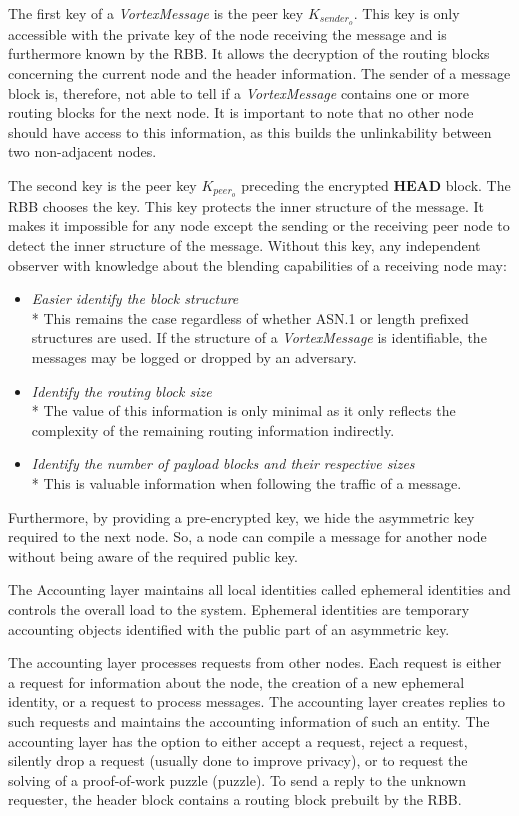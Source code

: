 \documentclass[acmsmall, screen]{acmart}
\begin{document}
The first key of a \emph{VortexMessage} is the peer key $K_{sender_o}$. This key is only accessible with the private key of the node receiving the message and is furthermore known by the RBB. It allows the decryption of the routing blocks concerning the current node and the header information. The sender of a message block is, therefore, not able to tell if a \emph{VortexMessage} contains one or more routing blocks for the next node. It is important to note that no other node should have access to this information, as this builds the unlinkability between two non-adjacent nodes. 

The second key is the peer key $K_{peer_o}$ preceding the encrypted $\mathbf{HEAD}$ block. The RBB chooses the key. This key protects the inner structure of the message. It makes it impossible for any node except the sending or the receiving peer node to detect the inner structure of the message. Without this key, any independent observer with knowledge about the blending capabilities of a receiving node may:
\begin{itemize}
	\item \emph{Easier identify the block structure}\\*
	This remains the case regardless of whether ASN.1 or length prefixed structures are used. If the structure of a \emph{VortexMessage} is identifiable, the messages may be logged or dropped by an adversary.
	\item \emph{Identify the routing block size}\\*
	The value of this information is only minimal as it only reflects the complexity of the remaining routing information indirectly.
	\item \emph{Identify the number of payload blocks and their respective sizes}\\*
	This is valuable information when following the traffic of a message.
\end{itemize}

Furthermore, by providing a pre-encrypted key, we hide the asymmetric key required to the next node. So, a node can compile a message for another node without being aware of the required public key.

The Accounting layer maintains all local identities called ephemeral identities and controls the overall load to the system. Ephemeral identities are temporary accounting objects identified with the public part of an asymmetric key. 

The accounting layer processes requests from other nodes. Each request is either a request for information about the node, the creation of a new ephemeral identity, or a request to process messages. The accounting layer creates replies to such requests and maintains the accounting information of such an entity. The accounting layer has the option to either accept a request, reject a request, silently drop a request (usually done to improve privacy), or to request the solving of a proof-of-work puzzle (puzzle). To send a reply to the unknown requester, the header block contains a routing block prebuilt by the RBB.
\end{document}
